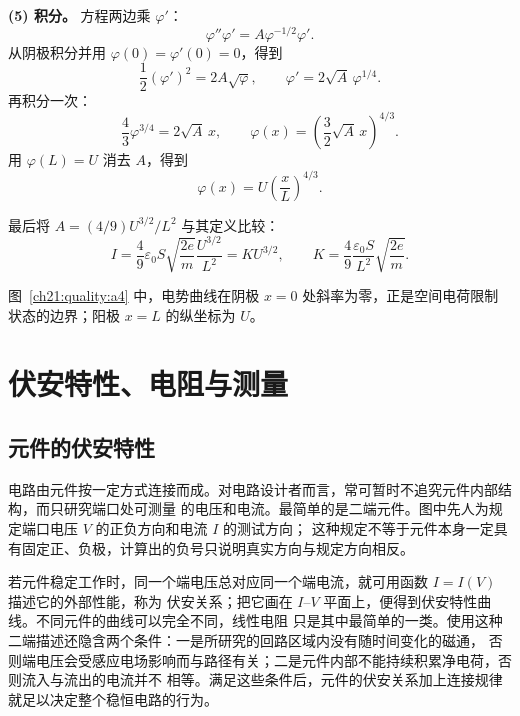 {\begin{xesolution}
\textbf{(5) 积分。} 方程两边乘 $\varphi'$：
\[
  \varphi''\varphi'=A\varphi^{-1/2}\varphi'.
\]
从阴极积分并用 $\varphi(0)=\varphi'(0)=0$，得到
\[
  \frac12(\varphi')^2=2A\sqrt\varphi,
  \qquad \varphi'=2\sqrt A\,\varphi^{1/4}.
\]
再积分一次：
\[
  \frac43\varphi^{3/4}=2\sqrt A\,x,
  \qquad
  \varphi(x)=\left(\frac32\sqrt A\,x\right)^{4/3}.
\]
用 $\varphi(L)=U$ 消去 $A$，得到
\[
  \boxed{\varphi(x)=U\left(\frac xL\right)^{4/3}}.
\]

\par\noindent\begin{minipage}{\linewidth}
\childLangmuirFigure
{}
\end{minipage}\par\medskip

最后将 $A=(4/9)U^{3/2}/L^2$ 与其定义比较：
\[
  \boxed{I=\frac49\varepsilon_0S\sqrt{\frac{2e}{m}}
  \frac{U^{3/2}}{L^2}=KU^{3/2}},
  \qquad
  \boxed{K=\frac49\frac{\varepsilon_0S}{L^2}\sqrt{\frac{2e}{m}}}.
\]

图~\ref{ch21:quality:a4} 中，电势曲线在阴极 $x=0$ 处斜率为零，正是空间电荷限制状态的边界；阳极 $x=L$ 的纵坐标为 $U$。
\end{xesolution}



\section{伏安特性、电阻与测量}

\subsection{元件的伏安特性}


电路由元件按一定方式连接而成。对电路设计者而言，常可暂时不追究元件内部结构，而只研究端口处可测量
的电压和电流。最简单的是二端元件。图中先人为规定端口电压 $V$ 的正负方向和电流 $I$ 的测试方向；
这种规定不等于元件本身一定具有固定正、负极，计算出的负号只说明真实方向与规定方向相反。

\par\noindent\begin{minipage}{\linewidth}
\ivCharacteristicFigure
{}
\end{minipage}\par\medskip

若元件稳定工作时，同一个端电压总对应同一个端电流，就可用函数 $I=I(V)$ 描述它的外部性能，称为
伏安关系；把它画在 $I$--$V$ 平面上，便得到伏安特性曲线。不同元件的曲线可以完全不同，线性电阻
只是其中最简单的一类。使用这种二端描述还隐含两个条件：一是所研究的回路区域内没有随时间变化的磁通，
否则端电压会受感应电场影响而与路径有关；二是元件内部不能持续积累净电荷，否则流入与流出的电流并不
相等。满足这些条件后，元件的伏安关系加上连接规律就足以决定整个稳恒电路的行为。


}
